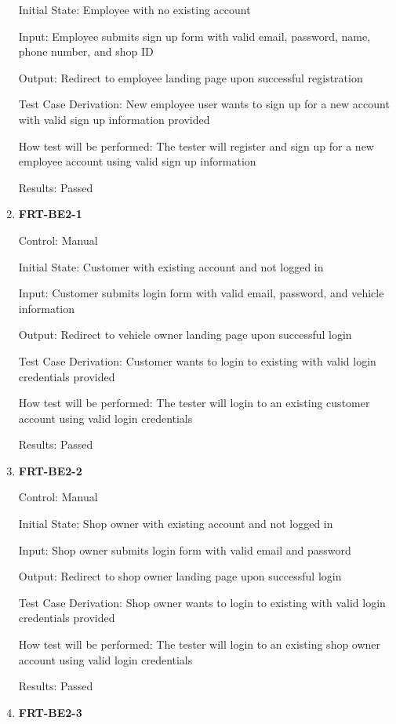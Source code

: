 \documentclass[12pt, titlepage]{article}
\begin{document}
\begin{enumerate}
	      Initial State: Employee with no existing account

	      Input: Employee submits sign up form with valid email, password, name, phone number, and shop ID

	      Output: Redirect to employee landing page upon successful registration

	      Test Case Derivation: New employee user wants to sign up for a new account with valid sign up
	      information provided

	      How test will be performed: The tester will register and sign up for a new employee account using
	      valid sign up information

	      Results: Passed

	\item \textbf{FRT-BE2-1}

	      Control: Manual

	      Initial State: Customer with existing account and not logged in

	      Input: Customer submits login form with valid email, password, and vehicle information

	      Output: Redirect to vehicle owner landing page upon successful login

	      Test Case Derivation: Customer wants to login to existing with valid login credentials provided

	      How test will be performed: The tester will login to an existing customer account using valid login
	      credentials

	      Results: Passed

	\item \textbf{FRT-BE2-2}

	      Control: Manual

	      Initial State: Shop owner with existing account and not logged in

	      Input: Shop owner submits login form with valid email and password

	      Output: Redirect to shop owner landing page upon successful login

	      Test Case Derivation: Shop owner wants to login to existing with valid login credentials provided

	      How test will be performed: The tester will login to an existing shop owner account using valid
	      login credentials

	      Results: Passed

	\item \textbf{FRT-BE2-3}


\end{enumerate}
\end{document}
